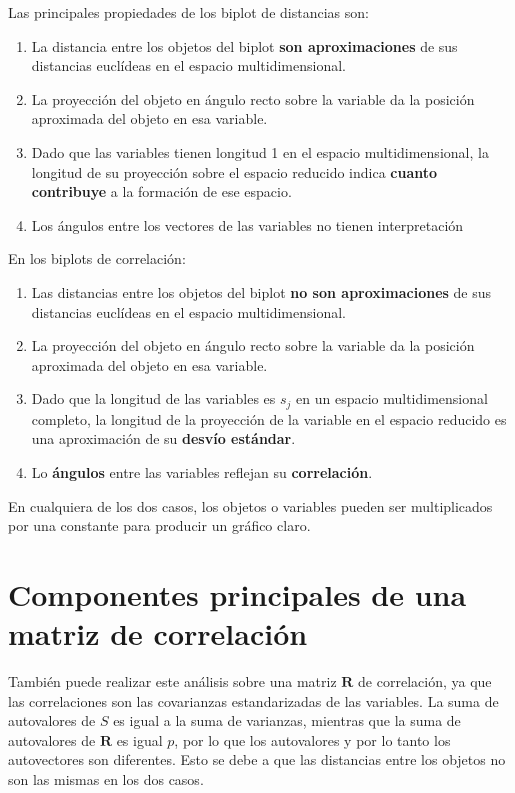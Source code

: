 \documentclass[]{book}
\theoremstyle{definition}
\theoremstyle{definition}
\theoremstyle{definition}
\theoremstyle{remark}
\begin{document}
Las principales propiedades de los biplot de distancias son:

\begin{enumerate}
\def\labelenumi{\arabic{enumi}.}
\item
  La distancia entre los objetos del biplot \textbf{son aproximaciones}
  de sus distancias euclídeas en el espacio multidimensional.
\item
  La proyección del objeto en ángulo recto sobre la variable da la
  posición aproximada del objeto en esa variable.
\item
  Dado que las variables tienen longitud 1 en el espacio
  multidimensional, la longitud de su proyección sobre el espacio
  reducido indica \textbf{cuanto contribuye} a la formación de ese
  espacio.
\item
  Los ángulos entre los vectores de las variables no tienen
  interpretación
\end{enumerate}

En los biplots de correlación:

\begin{enumerate}
\def\labelenumi{\arabic{enumi}.}
\item
  Las distancias entre los objetos del biplot \textbf{no son
  aproximaciones} de sus distancias euclídeas en el espacio
  multidimensional.
\item
  La proyección del objeto en ángulo recto sobre la variable da la
  posición aproximada del objeto en esa variable.
\item
  Dado que la longitud de las variables es \(s_{j}\) en un espacio
  multidimensional completo, la longitud de la proyección de la variable
  en el espacio reducido es una aproximación de su \textbf{desvío
  estándar}.
\item
  Lo \textbf{ángulos} entre las variables reflejan su
  \textbf{correlación}.
\end{enumerate}

En cualquiera de los dos casos, los objetos o variables pueden ser
multiplicados por una constante para producir un gráfico claro.

\hypertarget{componentes-principales-de-una-matriz-de-correlacion}{%
\section{Componentes principales de una matriz de
correlación}\label{componentes-principales-de-una-matriz-de-correlacion}}

También puede realizar este análisis sobre una matriz \(\mathbf{R}\) de
correlación, ya que las correlaciones son las covarianzas estandarizadas
de las variables. La suma de autovalores de \(S\) es igual a la suma de
varianzas, mientras que la suma de autovalores de \(\mathbf{R}\) es
igual \(p\), por lo que los autovalores y por lo tanto los autovectores
son diferentes. Esto se debe a que las distancias entre los objetos no
son las mismas en los dos casos.
\end{document}
